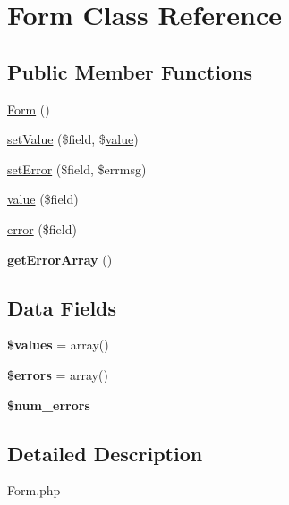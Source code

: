 \hypertarget{class_form}{\section{Form Class Reference}
\label{class_form}
}
\subsection*{Public Member Functions}
\begin{DoxyCompactItemize}
\item 
\hyperlink{class_form_ac4046522e82d580626a73c4684e234c5}{Form} ()
\item 
\hyperlink{class_form_af8838d7816add25dac386d6d71427379}{set\-Value} (\$field, \$\hyperlink{class_form_a944881abe5894d0926dc056308d6048a}{value})
\item 
\hyperlink{class_form_a00876b4d5129b57841719277ec0786fb}{set\-Error} (\$field, \$errmsg)
\item 
\hyperlink{class_form_a944881abe5894d0926dc056308d6048a}{value} (\$field)
\item 
\hyperlink{class_form_af5f11cc338d1b6ef4a3bce945a76d8ca}{error} (\$field)
\item 
\hypertarget{class_form_a2b74fa7c6be9ab9c3e8fda8a9172a545}{{\bfseries get\-Error\-Array} ()}\label{class_form_a2b74fa7c6be9ab9c3e8fda8a9172a545}

\end{DoxyCompactItemize}
\subsection*{Data Fields}
\begin{DoxyCompactItemize}
\item 
\hypertarget{class_form_affc45c6ace2eeb3f300b054dbf9592b6}{{\bfseries \$values} = array()}\label{class_form_affc45c6ace2eeb3f300b054dbf9592b6}

\item 
\hypertarget{class_form_ab24faf4aa647cdcee494fc48524ad4ff}{{\bfseries \$errors} = array()}\label{class_form_ab24faf4aa647cdcee494fc48524ad4ff}

\item 
\hypertarget{class_form_a485cdde5f981a2e1bfc01f4bb07bca7a}{{\bfseries \$num\-\_\-errors}}\label{class_form_a485cdde5f981a2e1bfc01f4bb07bca7a}

\end{DoxyCompactItemize}


\subsection{Detailed Description}
Form.\-php

